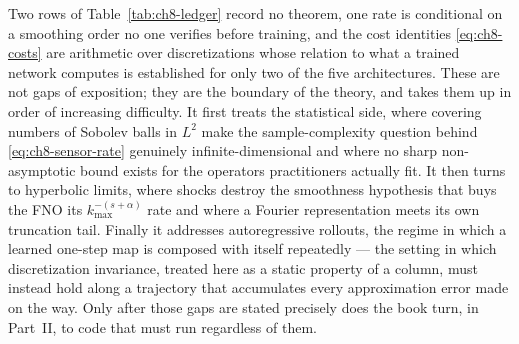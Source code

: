 
Two rows of Table~\ref{tab:ch8-ledger} record no theorem, one rate is conditional on a smoothing order no one verifies before training, and the cost identities \eqref{eq:ch8-costs} are arithmetic over discretizations whose relation to what a trained network computes is established for only two of the five architectures. These are not gaps of exposition; they are the boundary of the theory, and  takes them up in order of increasing difficulty. It first treats the statistical side, where covering numbers of Sobolev balls in $L^2$ make the sample-complexity question behind \eqref{eq:ch8-sensor-rate} genuinely infinite-dimensional and where no sharp non-asymptotic bound exists for the operators practitioners actually fit. It then turns to hyperbolic limits, where shocks destroy the smoothness hypothesis that buys the FNO its $k_{\max}^{-(s+\alpha)}$ rate and where a Fourier representation meets its own truncation tail. Finally it addresses autoregressive rollouts, the regime in which a learned one-step map is composed with itself repeatedly --- the setting in which discretization invariance, treated here as a static property of a column, must instead hold along a trajectory that accumulates every approximation error made on the way. Only after those gaps are stated precisely does the book turn, in Part~II, to code that must run regardless of them. 
